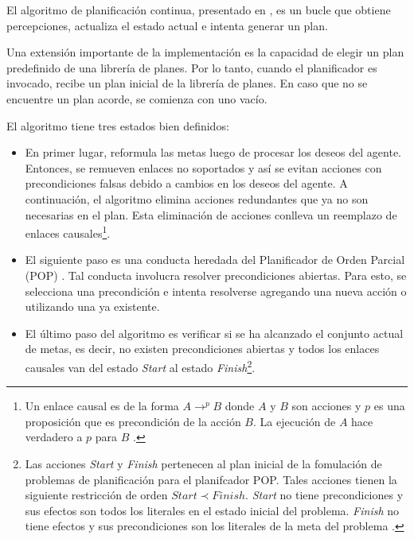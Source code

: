 	El algoritmo de planificaci\'on continua, presentado en \cite{gbraun:tesisMarioMoya}, es un
	bucle que obtiene percepciones, actualiza el estado actual 
	e intenta generar un plan.
	
	Una extensi\'on importante de la implementaci\'on es la capacidad
	de elegir un plan predefinido de una librer\'ia de planes. Por lo 
	tanto, cuando el planificador es invocado, recibe un plan inicial
	de la librer\'ia de planes. En caso que no se encuentre un plan
	acorde, se comienza con uno vac\'io.
	
	El algoritmo tiene tres estados bien definidos:
	
	\begin{itemize}
	
	\item En primer lugar, reformula las metas
	luego de procesar los deseos del agente. Entonces, se
	remueven enlaces no soportados y as\'i se evitan acciones
	con precondiciones falsas debido a cambios en los deseos
	del agente. A continuaci\'on, el algoritmo elimina acciones 
	redundantes que ya no son necesarias en el plan. Esta eliminaci\'on de 
	acciones conlleva un reemplazo de enlaces causales\footnote{Un enlace causal 
	es de la forma $A \longrightarrow^{p} B$ donde $A$ y $B$ son acciones 
	y $p$ es una proposici\'on 
	que es precondici\'on de la acci\'on $B$. La ejecuci\'on de $A$ 
	hace verdadero a $p$ para $B$ \cite{russell03:_artif_intel}.}. 
	
	\item El siguiente paso es una conducta heredada del Planificador
	de Orden Parcial (POP) \cite{gbraun:pop:1991}. Tal conducta involucra resolver 
	precondiciones abiertas. Para esto, se selecciona una precondici\'on
	e intenta resolverse agregando una nueva acci\'on o utilizando una
	ya existente.
	
	\item El \'ultimo paso del algoritmo es verificar si se ha alcanzado
	el conjunto actual de metas, es decir, no existen precondiciones
	abiertas y todos los enlaces causales van del estado \emph{Start} al
	estado \emph{Finish}\footnote{Las acciones \emph{Start} y \emph{Finish}
	pertenecen al plan inicial de la fomulaci\'on de problemas de planificaci\'on
	para el planifcador POP. Tales acciones tienen la siguiente restricci\'on de orden
	$Start \prec Finish$. \emph{Start} no tiene precondiciones y sus efectos
	son todos los literales en el estado inicial del problema. \emph{Finish}
	no tiene efectos y sus precondiciones son los literales de la
        meta del problema \cite{russell03:_artif_intel}.}.
	\end{itemize}
	

